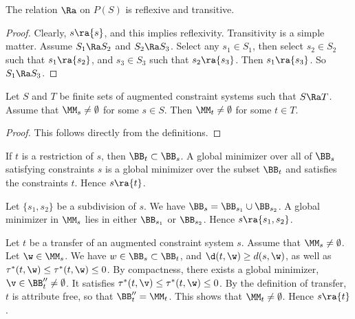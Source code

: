 \begin{lemma}
The relation $\Ra$ on $P(S)$ is reflexive and transitive.
\end{lemma}

\begin{proof}  Clearly, $s\ra \{s\}$, and this implies reflexivity.
Transitivity is a simple matter.  Assume
$S_1\Ra S_2$ and $S_2\Ra S_3$.  Select any $s_1\in S_1$, then select
$s_2\in S_2$ such that $s_1\ra \{s_2\}$, and $s_3\in S_3$ such
that $s_2\ra \{s_3\}$.  Then $s_1\ra\{s_3\}$.  So $S_1\Ra S_3$.
\end{proof}

\begin{lemma}\label{lemma:propagate}
Let $S$  and $T$ be finite sets of augmented constraint systems such that
$S\Ra T$.  Assume that $\MM_s\ne\emptyset$ for some $s\in S$.
Then $\MM_t\ne\emptyset$ for some $t\in T$.
\end{lemma}

\begin{proof} This follows directly from the definitions. 
\end{proof}

\begin{example}[restriction]
If $t$ is a restriction of $s$, then $\BB_t\subset \BB_s$.
A global minimizer over all of $\BB_s$ satisfying constraints $s$ is
a global minimizer over the subset $\BB_t$ and satisfies the
constraints $t$.  Hence $s\ra\{t\}$.
\end{example}

\begin{example}[subdivision]
Let $\{s_1,s_2\}$ be a subdivision of $s$.  We have $\BB_s =
\BB_{s_1}\cup \BB_{s_2}$.  A global minimizer in $\MM_s$ lies in
either $\BB_{s_1}$ or $\BB_{s_2}$.  Hence $s\ra\{s_1,s_2\}$.
\end{example}

\begin{example}  Let $t$ be a transfer of
an augmented constraint system $s$.  Assume that $\MM_s\ne\emptyset$.
Let $\w\in \MM_s$.
We have $w\in \BB_s\subset\BB_t$, and $\d(t,\w) \ge d(s,\w)$,
as well as $\tau^*(t,\w)\le\tau^*(t,\w)\le 0$.   By compactness, there
exists a global minimizer,
$\v\in\BB''_t\ne\emptyset$.  It satisfies
$\tau^*(t,\v)\le\tau^*(t,\w)\le 0$.  By the definition of transfer,
$t$
is attribute free, so that $\BB''_t=\MM_t$.  This shows that
$\MM_t\ne\emptyset$.
Hence $s\ra\{t\}$.
\end{example}

